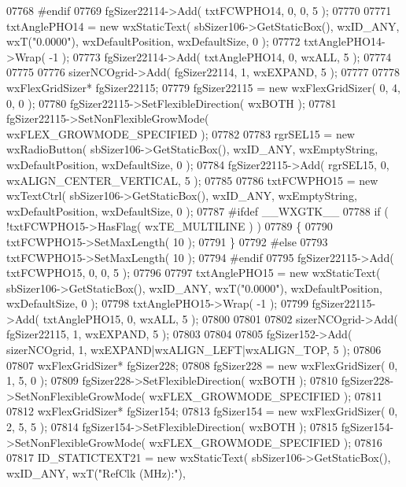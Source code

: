 \begin{DoxyCode}
07768 \textcolor{preprocessor}{    #endif}
07769     fgSizer22114->Add( txtFCWPHO14, 0, 0, 5 );
07770     
07771     txtAnglePHO14 = \textcolor{keyword}{new} wxStaticText( sbSizer106->GetStaticBox(), wxID\_ANY, wxT(\textcolor{stringliteral}{"0.0000"}), 
      wxDefaultPosition, wxDefaultSize, 0 );
07772     txtAnglePHO14->Wrap( -1 );
07773     fgSizer22114->Add( txtAnglePHO14, 0, wxALL, 5 );
07774     
07775     
07776     sizerNCOgrid->Add( fgSizer22114, 1, wxEXPAND, 5 );
07777     
07778     wxFlexGridSizer* fgSizer22115;
07779     fgSizer22115 = \textcolor{keyword}{new} wxFlexGridSizer( 0, 4, 0, 0 );
07780     fgSizer22115->SetFlexibleDirection( wxBOTH );
07781     fgSizer22115->SetNonFlexibleGrowMode( wxFLEX\_GROWMODE\_SPECIFIED );
07782     
07783     rgrSEL15 = \textcolor{keyword}{new} wxRadioButton( sbSizer106->GetStaticBox(), wxID\_ANY, wxEmptyString, wxDefaultPosition, 
      wxDefaultSize, 0 );
07784     fgSizer22115->Add( rgrSEL15, 0, wxALIGN\_CENTER\_VERTICAL, 5 );
07785     
07786     txtFCWPHO15 = \textcolor{keyword}{new} wxTextCtrl( sbSizer106->GetStaticBox(), wxID\_ANY, wxEmptyString, wxDefaultPosition, 
      wxDefaultSize, 0 );
07787 \textcolor{preprocessor}{    #ifdef \_\_WXGTK\_\_}
07788     \textcolor{keywordflow}{if} ( !txtFCWPHO15->HasFlag( wxTE\_MULTILINE ) )
07789     \{
07790     txtFCWPHO15->SetMaxLength( 10 );
07791     \}
07792 \textcolor{preprocessor}{    #else}
07793     txtFCWPHO15->SetMaxLength( 10 );
07794 \textcolor{preprocessor}{    #endif}
07795     fgSizer22115->Add( txtFCWPHO15, 0, 0, 5 );
07796     
07797     txtAnglePHO15 = \textcolor{keyword}{new} wxStaticText( sbSizer106->GetStaticBox(), wxID\_ANY, wxT(\textcolor{stringliteral}{"0.0000"}), 
      wxDefaultPosition, wxDefaultSize, 0 );
07798     txtAnglePHO15->Wrap( -1 );
07799     fgSizer22115->Add( txtAnglePHO15, 0, wxALL, 5 );
07800     
07801     
07802     sizerNCOgrid->Add( fgSizer22115, 1, wxEXPAND, 5 );
07803     
07804     
07805     fgSizer152->Add( sizerNCOgrid, 1, wxEXPAND|wxALIGN\_LEFT|wxALIGN\_TOP, 5 );
07806     
07807     wxFlexGridSizer* fgSizer228;
07808     fgSizer228 = \textcolor{keyword}{new} wxFlexGridSizer( 0, 1, 5, 0 );
07809     fgSizer228->SetFlexibleDirection( wxBOTH );
07810     fgSizer228->SetNonFlexibleGrowMode( wxFLEX\_GROWMODE\_SPECIFIED );
07811     
07812     wxFlexGridSizer* fgSizer154;
07813     fgSizer154 = \textcolor{keyword}{new} wxFlexGridSizer( 0, 2, 5, 5 );
07814     fgSizer154->SetFlexibleDirection( wxBOTH );
07815     fgSizer154->SetNonFlexibleGrowMode( wxFLEX\_GROWMODE\_SPECIFIED );
07816     
07817     ID_STATICTEXT21 = \textcolor{keyword}{new} wxStaticText( sbSizer106->GetStaticBox(), wxID\_ANY, wxT(\textcolor{stringliteral}{"RefClk (MHz):"}), 

\end{DoxyCode}
